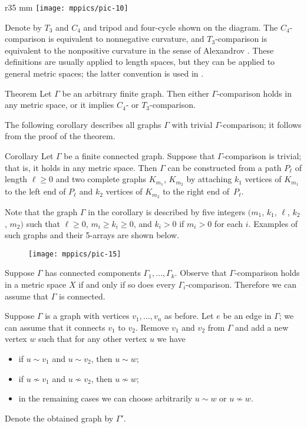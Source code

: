 \documentclass{article}
\begin{document}
\begin{wrapfigure}{r}{35 mm}
\vskip-6mm
\centering
\texttt{[image: mppics/pic-10]}
\end{wrapfigure}

Denote by $T_3$ and $C_4$ and tripod and four-cycle shown on the diagram.
The $C_4$-comparison is equivalent to nonnegative curvature,
and $T_3$-comparison is equivalent to the nonpositive curvature in the sense of Alexandrov \cite{lebedeva-petrunin-zolotov}.
These definitions are usually applied to length spaces, but they can be applied to general metric spaces;
the latter convention is used in \cite{alexander2019alexandrov}.

\begin{thm}{Theorem}
Let $\Gamma$ be an arbitrary finite graph.
Then either $\Gamma$-comparison holds in any metric space,
or it implies $C_4$- or $T_3$-comparison.
\end{thm}

The following corollary describes all graphs $\Gamma$ with trivial $\Gamma$-comparison;
it follows from the proof of the theorem.

\begin{thm}{Corollary} Let $\Gamma$ be a finite connected graph.
Suppose that $\Gamma$-comparison is trivial;
that is, it holds in any metric space.
Then $\Gamma$ can be constructed from a path $P_{\ell}$ of length $\ell\ge 0$ and two complete graphs $K_{m_1}$, $K_{m_2}$ by attaching $k_1$ vertices of $K_{m_1}$ to the left end of $P_{\ell}$ and $k_2$ vertices of $K_{m_2}$ to the right end of~$P_{\ell}$.
\end{thm}

Note that the graph $\Gamma$ in the corollary is described by five integers $(m_1$, $k_1$, $\ell$, $k_2$, $m_2)$ such that $\ell \geqslant 0$, $m_i\geqslant k_i\ge 0$, and $k_i>0$ if $m_i>0$ for each $i$.
Examples of such graphs and their 5-arrays are shown below.
\begin{figure}[ht!]
\centering
\texttt{[image: mppics/pic-15]}
\end{figure}

\bigskip

Suppose $\Gamma$ has connected components $\Gamma_1,\dots,\Gamma_k$.
Observe that $\Gamma$-comparison holds in a metric space $X$ if and only if so does every $\Gamma_i$-comparison.
Therefore we can assume that $\Gamma$ is connected.

Suppose $\Gamma$ is a graph with vertices $v_1,\dots,v_n$ as before.
Let $e$ be an edge in $\Gamma$; we can assume that it connects $v_1$ to $v_2$.
Remove $v_1$ and $v_2$ from $\Gamma$ and add a new vertex $w$ such that for any other vertex $u$ we have
\begin{itemize}
 \item if $u\sim v_1$ and $u\sim v_2$, then $u\sim w$;
 \item if $u\nsim v_1$ and $u\nsim v_2$, then $u\nsim w$;
 \item in the remaining cases we can choose arbitrarily $u\sim w$ or $u\nsim w$.
\end{itemize}
Denote the obtained graph by $\Gamma'$.
\end{document}
